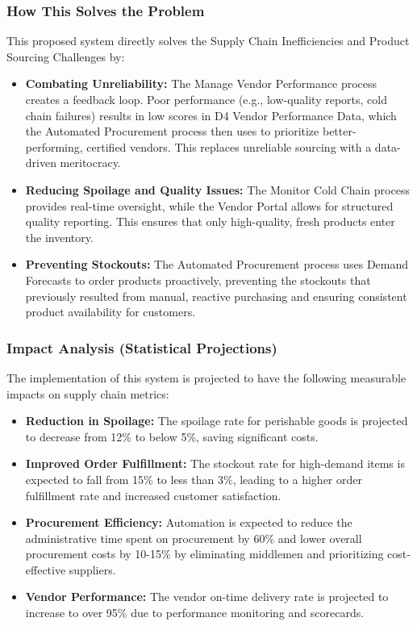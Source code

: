 \documentclass[12pt,a4paper]{article}
\begin{document}
\subsubsection{How This Solves the Problem}
This proposed system directly solves the Supply Chain Inefficiencies and Product Sourcing Challenges by:
\begin{itemize}[leftmargin=*]
  \item \textbf{Combating Unreliability:} The Manage Vendor Performance process creates a feedback loop. Poor performance (e.g., low-quality reports, cold chain failures) results in low scores in D4 Vendor Performance Data, which the Automated Procurement process then uses to prioritize better-performing, certified vendors. This replaces unreliable sourcing with a data-driven meritocracy.
  \item \textbf{Reducing Spoilage and Quality Issues:} The Monitor Cold Chain process provides real-time oversight, while the Vendor Portal allows for structured quality reporting. This ensures that only high-quality, fresh products enter the inventory.
  \item \textbf{Preventing Stockouts:} The Automated Procurement process uses Demand Forecasts to order products proactively, preventing the stockouts that previously resulted from manual, reactive purchasing and ensuring consistent product availability for customers.
\end{itemize}

\subsubsection{Impact Analysis (Statistical Projections)}
The implementation of this system is projected to have the following measurable impacts on supply chain metrics:

\begin{itemize}
    \item \textbf{Reduction in Spoilage:} The spoilage rate for perishable goods is projected to decrease from 12\% to below 5\%, saving significant costs.
    \item \textbf{Improved Order Fulfillment:} The stockout rate for high-demand items is expected to fall from 15\% to less than 3\%, leading to a higher order fulfillment rate and increased customer satisfaction.
    \item \textbf{Procurement Efficiency:} Automation is expected to reduce the administrative time spent on procurement by 60\% and lower overall procurement costs by 10-15\% by eliminating middlemen and prioritizing cost-effective suppliers.
    \item \textbf{Vendor Performance:} The vendor on-time delivery rate is projected to increase to over 95\% due to performance monitoring and scorecards.
\end{itemize}
\end{document}
